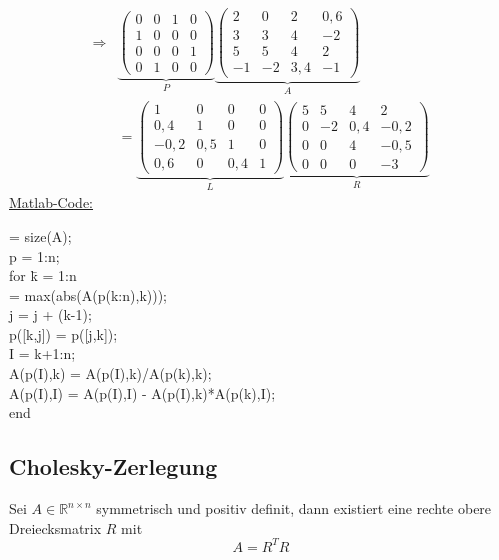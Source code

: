 \documentclass[a4paper,twocolumn,10pt]{article}
\begin{document}
\begin{equation*}
\begin{split}
\Rightarrow&\underbrace{\begin{pmatrix}0 & 0 & 1 & 0 \\ 1 & 0 & 0 & 0 \\ 0 & 0 & 0 & 1 \\ 0 & 1 & 0 & 0\end{pmatrix}}_{P}\underbrace{\begin{pmatrix}2 & 0 & 2 & 0,6 \\ 3 & 3 & 4 & -2 \\ 5 & 5 & 4 & 2 \\ -1 & -2 & 3,4 & -1\end{pmatrix}}_{A}\\
&=\underbrace{\begin{pmatrix}1 & 0 & 0 & 0 \\ 0,4 & 1 & 0 & 0 \\ -0,2 & 0,5 & 1 & 0 \\ 0,6 & 0 & 0,4 & 1\end{pmatrix}}_{L}\underbrace{\begin{pmatrix}5 & 5 & 4 & 2 \\ 0 & -2 & 0,4 & -0,2 \\ 0 & 0 & 4 & -0,5 \\ 0 & 0 & 0 & -3\end{pmatrix}}_{R}
\end{split}
\end{equation*}
\underline{Matlab-Code:}
\begin{tabbing}
[n,$\sim$] = size(A);\\
p = 1:n;\\
for \=k = 1:n\\
    \>[$\sim$,j] = max(abs(A(p(k:n),k)));\\
    \>j = j + (k-1);\\
    \>p([k,j]) = p([j,k]);\\
    \>I = k+1:n;\\
    \>A(p(I),k) = A(p(I),k)/A(p(k),k);\\
    \>A(p(I),I) = A(p(I),I) - A(p(I),k)*A(p(k),I);\\
end
\end{tabbing}

\subsection{Cholesky-Zerlegung}
Sei $A\in\mathbb{R}^{n\times n}$ symmetrisch und positiv definit, dann existiert eine rechte obere Dreiecksmatrix $R$ mit
\begin{equation*}
A=R^TR
\end{equation*}
\end{document}
